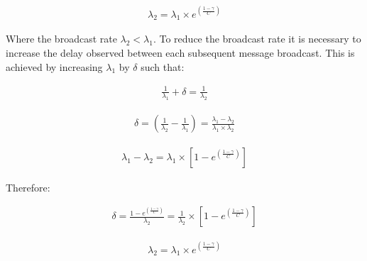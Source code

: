       \begin{equation*}
		     \begin{aligned}
		         \lambda_2 = \lambda_1 \times e ^{ ({\frac{1-\gamma}{C}})}
		     \end{aligned}
    \end{equation*} 
    
    Where the broadcast rate $\lambda_2 < \lambda_1$.  To reduce the broadcast rate it is necessary to increase the delay observed between each subsequent message broadcast.  This is achieved by increasing $\lambda_1$ by $\delta$ such that:
    
    \begin{equation}
		     \begin{aligned}
		         \frac{1}{\lambda_1} + \delta = \frac{1}{\lambda_2}
		     \end{aligned}
    \end{equation} 
    
    \begin{equation}
		     \begin{aligned}
		         \delta = (\frac{1}{\lambda_2} - \frac{1}{\lambda_1}) = \frac{\lambda_1 - \lambda_2}{\lambda_1 \times \lambda_2}
		     \end{aligned}
    \end{equation} 
        
    \begin{equation}
		     \begin{aligned}
		         \lambda_1 - \lambda_2 = \lambda_1 \times [1 - e ^{ ({\frac{1-\gamma}{C}})}]
		     \end{aligned}
    \end{equation} 
    
    Therefore:
    
    \begin{equation}
		     \begin{aligned}
		         \delta = \frac{1 - e ^{ ({\frac{1-\gamma}{C}})}}{\lambda_2} = \frac{1}{\lambda_2} \times [1 - e ^{ ({\frac{1-\gamma}{C}})}]
		     \end{aligned}
    \end{equation}
    
    \begin{equation}
		     \begin{aligned}
		         \lambda_2 = \lambda_1 \times e ^{ ({\frac{1-\gamma}{C}})}
		     \end{aligned}
    \end{equation}     
    
